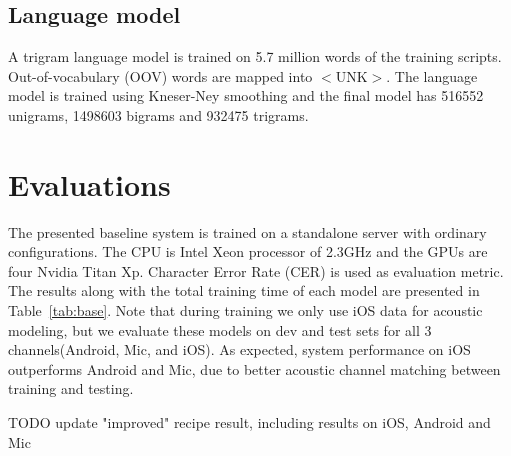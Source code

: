 \documentclass[a4paper]{article}
\begin{document}
\subsection{Language model}

A trigram language model is trained on 5.7 million words of the training
scripts. Out-of-vocabulary (OOV) words are mapped into $<$UNK$>$. The language
model is trained using Kneser-Ney smoothing and the final model has 516552
unigrams, 1498603 bigrams and 932475 trigrams.

\section{Evaluations}

The presented baseline system is trained on a standalone server with ordinary
configurations. The CPU is Intel Xeon processor of 2.3GHz and the GPUs are four
Nvidia Titan Xp. Character Error Rate (CER) is used as evaluation metric. 
The results along with the total training time of each model are presented in Table~\ref{tab:base}. 
Note that during training we only use iOS data for acoustic modeling, but we evaluate
these models on dev and test sets for all 3 channels(Android, Mic, and iOS). As
expected, system performance on iOS outperforms Android and Mic, due to better
acoustic channel matching between training and testing.

TODO update "improved" recipe result, including results on iOS, Android and Mic
\end{document}
